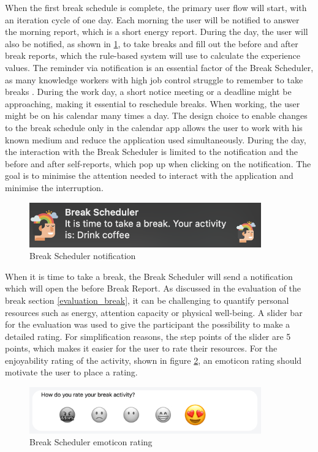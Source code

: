 \documentclass{hasel_thesis}
\begin{document}
When the first break schedule is complete, the primary user flow will start, with an iteration cycle of one day. Each morning the user will be notified to answer the morning report, which is a short energy report. During the day, the user will also be notified, as shown in \ref{fig:notification}, to take breaks and fill out the before and after break reports, which the rule-based system will use to calculate the experience values. The reminder via notification is an essential factor of the Break Scheduler, as many knowledge workers with high job control struggle to remember to take breaks \cite{McLean.2001}. During the work day, a short notice meeting or a deadline might be approaching, making it essential to reschedule breaks. When working, the user might be on his calendar many times a day. The design choice to enable changes to the break schedule only in the calendar app allows the user to work with his known medium and reduce the application used simultaneously. During the day, the interaction with the Break Scheduler is limited to the notification and the before and after self-reports, which pop up when clicking on the notification. The goal is to minimise the attention needed to interact with the application and minimise the interruption. 

\begin{figure}[htp]
    \centering
    \includegraphics[width=10cm]{hasel_thesis/images/notification.png}
    \caption{Break Scheduler notification}
    \label{fig:notification}
\end{figure}

When it is time to take a break, the Break Scheduler will send a notification which will open the before Break Report. As discussed in the evaluation of the break section \ref{evaluation_break}, it can be challenging to quantify personal resources such as energy, attention capacity or physical well-being. A slider bar for the evaluation was used to give the participant the possibility to make a detailed rating. For simplification reasons, the step points of the slider are 5 points, which makes it easier for the user to rate their resources. For the enjoyability rating of the activity, shown in figure \ref{fig:rating}, an emoticon rating should motivate the user to place a rating.

\begin{figure}[htp]
    \centering
    \includegraphics[width=10cm]{hasel_thesis/images/rating.png}
    \caption{Break Scheduler emoticon rating}
    \label{fig:rating}
\end{figure}
\end{document}
